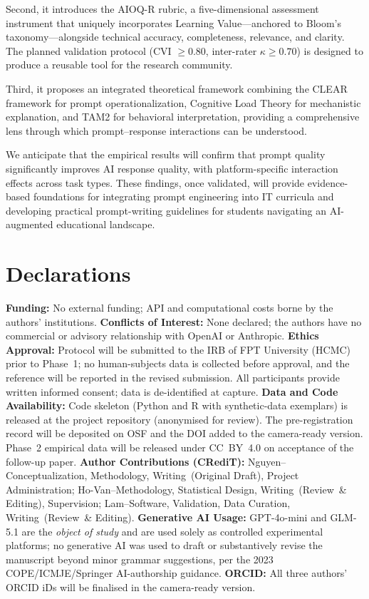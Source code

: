 \documentclass[runningheads]{llncs}
\begin{document}
Second, it introduces the AIOQ-R rubric, a five-dimensional assessment instrument that uniquely incorporates Learning Value---anchored to Bloom's taxonomy---alongside technical accuracy, completeness, relevance, and clarity. The planned validation protocol (CVI $\geq 0.80$, inter-rater $\kappa \geq 0.70$) is designed to produce a reusable tool for the research community.

Third, it proposes an integrated theoretical framework combining the CLEAR framework for prompt operationalization, Cognitive Load Theory for mechanistic explanation, and TAM2 for behavioral interpretation, providing a comprehensive lens through which prompt--response interactions can be understood.

We anticipate that the empirical results will confirm that prompt quality significantly improves AI response quality, with platform-specific interaction effects across task types. These findings, once validated, will provide evidence-based foundations for integrating prompt engineering into IT curricula and developing practical prompt-writing guidelines for students navigating an AI-augmented educational landscape.

\section*{Declarations}\label{sec:declarations}

\noindent\textbf{Funding:} No external funding; API and computational costs borne by the authors' institutions.
\textbf{Conflicts of Interest:} None declared; the authors have no commercial or advisory relationship with OpenAI or Anthropic.
\textbf{Ethics Approval:} Protocol will be submitted to the IRB of FPT University (HCMC) prior to Phase~1; no human-subjects data is collected before approval, and the reference will be reported in the revised submission. All participants provide written informed consent; data is de-identified at capture.
\textbf{Data and Code Availability:} Code skeleton (Python and R with synthetic-data exemplars) is released at the project repository (anonymised for review). The pre-registration record will be deposited on OSF and the DOI added to the camera-ready version. Phase~2 empirical data will be released under CC~BY~4.0 on acceptance of the follow-up paper.
\textbf{Author Contributions (CRediT):} Nguyen--Conceptualization, Methodology, Writing~(Original Draft), Project Administration; Ho-Van--Methodology, Statistical Design, Writing~(Review~\& Editing), Supervision; Lam--Software, Validation, Data Curation, Writing~(Review~\& Editing).
\textbf{Generative AI Usage:} GPT-4o-mini and GLM-5.1 are the \emph{object of study} and are used solely as controlled experimental platforms; no generative AI was used to draft or substantively revise the manuscript beyond minor grammar suggestions, per the 2023 COPE/ICMJE/Springer AI-authorship guidance.
\textbf{ORCID:} All three authors' ORCID iDs will be finalised in the camera-ready version.

{\footnotesize


}


\end{document}
